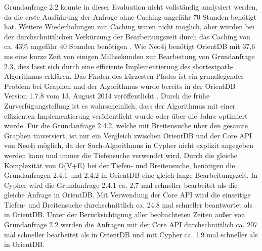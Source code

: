  Grundanfrage 2.2 konnte in dieser Evaluation nicht vollständig analysiert werden, da die erste Ausführung der Anfrage ohne Caching ungefähr 70 Stunden benötigt hat. Weitere Wiederholungen mit Caching waren nicht möglich, aber würden bei der durchschnittlichen Verkürzung der Bearbeitungszeit durch das Caching von ca. 43\%  ungefähr 40 Stunden benötigen . \newline
Wie Neo4j benötigt OrientDB mit 37,6 ms eine kurze Zeit von einigen Millisekunden zur Bearbeitung von Grundanfrage 2.3, dies lässt sich durch eine effiziente Implementierung des shortestpath-Algorithmus erklären. Das Finden des kürzesten Pfades ist ein grundlegendes Problem bei Graphen und der Algorithmus wurde bereits in der OrientDB Version 1.7.8 vom 13. August 2014 veröffentlicht \parencite{Old_OrientDB}. Durch die frühe Zurverfügungstellung ist es wahrscheinlich, dass der Algorithmus mit einer effizienten Implementierung veröffentlicht wurde oder über die Jahre optimiert wurde. \newline
Für die Grundanfrage 2.4.2, welche mit Breitensuche über den gesamte Graphen traversiert, ist nur ein Vergleich zwischen OrientDB und der Core API von Neo4j möglich, da der Such-Algorithmus in Cypher nicht explizit angegeben werden kann und immer die Tiefensuche verwendet wird. Durch die gleiche Komplexität von O(V+E) bei der Tiefen- und Breitensuche, benötigen die Grundanfragen 2.4.1 und 2.4.2 in OrientDB eine gleich lange Bearbeitungszeit. In Cypher wird die Grundanfrage 2.4.1 ca. 2,7 mal schneller bearbeitet als die gleiche Anfrage in OrientDB. Mit Verwendung der Core API wird die einseitige Tiefen- und Breitensuche durchschnittlich ca. 24.8 mal schneller beantwortet als in OrientDB. \newline
 Unter der Berücksichtigung aller beobachteten Zeiten außer von Grundanfrage 2.2 werden die Anfragen mit der Core API durchschnittlich ca. 207 mal schneller bearbeitet als in OrientDB und mit Cypher ca. 1,9 mal schneller als in OrientDB. 
\FloatBarrier

